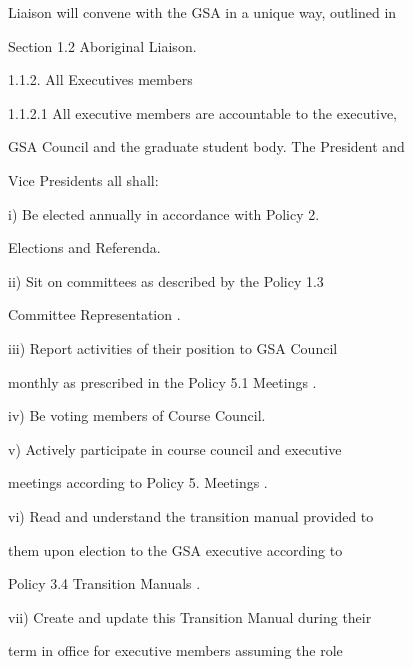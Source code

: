          Liaison will convene with the GSA in a unique way, outlined in  

         Section 1.2 Aboriginal Liaison.   

  

1.1.2. All Executives members  

  

1.1.2.1           All executive members are accountable to the executive,  

         GSA Council and the graduate student body. The President and  

         Vice Presidents all shall:   

  

         i)       Be     elected      annually       in    accordance         with     Policy       2.  

                  Elections and Referenda.   

  

         ii)       Sit   on   committees   as   described   by   the   Policy   1.3  



                   Committee Representation .   

  

         iii)     Report   activities   of   their   position   to   GSA   Council  

                  monthly as prescribed in the Policy 5.1 Meetings .   

  

         iv)      Be voting members of Course Council.   

  

         v)       Actively   participate   in   course   council   and   executive  

                  meetings according to Policy 5. Meetings .   

  

         vi)      Read  and  understand  the  transition  manual  provided  to  



                  them  upon  election  to  the  GSA  executive  according  to  



                  Policy 3.4 Transition Manuals .   

  

         vii)     Create  and  update  this  Transition  Manual  during  their  

                  term in office for executive  members  assuming the  role  

